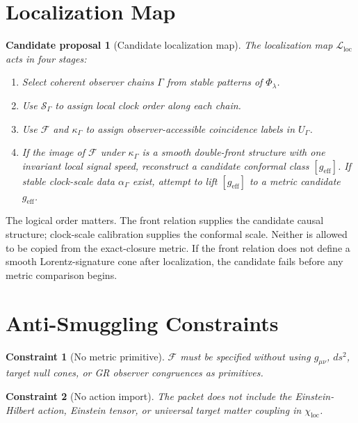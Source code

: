 \documentclass[11pt]{article}
\newcommand{\PhiFlow}{\Phi_{\lambda}}
\newcommand{\Map}{\mathcal{L}_{\mathrm{loc}}}
\newcommand{\Front}{\mathcal{F}}
\newcommand{\Order}{\mathcal{S}}
\newtheorem{proposal}{Candidate proposal}
\newtheorem{constraint}{Constraint}
\begin{document}
\section{Localization Map}

\begin{proposal}[Candidate localization map]
The localization map \(\Map\) acts in four stages:
\begin{enumerate}
    \item Select coherent observer chains \(\Gamma\) from stable patterns of
    \(\PhiFlow\).
    \item Use \(\Order_{\Gamma}\) to assign local clock order along each chain.
    \item Use \(\Front\) and \(\kappa_{\Gamma}\) to assign observer-accessible
    coincidence labels in \(U_{\Gamma}\).
    \item If the image of \(\Front\) under \(\kappa_{\Gamma}\) is a smooth
    double-front structure with one invariant local signal speed, reconstruct a
    candidate conformal class \([g_{\mathrm{eff}}]\). If stable clock-scale
    data \(\alpha_{\Gamma}\) exist, attempt to lift \([g_{\mathrm{eff}}]\) to a
    metric candidate \(g_{\mathrm{eff}}\).
\end{enumerate}
\end{proposal}

The logical order matters. The front relation supplies the candidate causal
structure; clock-scale calibration supplies the conformal scale. Neither is
allowed to be copied from the exact-closure metric. If the front relation does
not define a smooth Lorentz-signature cone after localization, the candidate
fails before any metric comparison begins.

\section{Anti-Smuggling Constraints}

\begin{constraint}[No metric primitive]
\(\Front\) must be specified without using \(g_{\mu\nu}\), \(ds^2\), target
null cones, or GR observer congruences as primitives.
\end{constraint}

\begin{constraint}[No action import]
The packet does not include the Einstein-Hilbert action, Einstein tensor, or
universal target matter coupling in \(\chi_{\mathrm{loc}}\).
\end{constraint}
\end{document}
